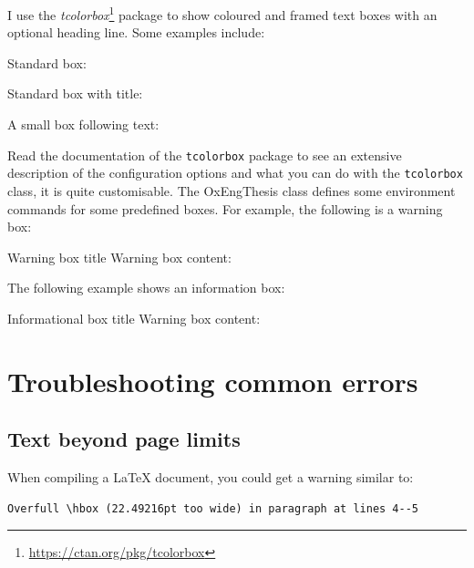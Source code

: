 I use the \textit{tcolorbox}\footnote{\url{https://ctan.org/pkg/tcolorbox}} package to show coloured and framed text boxes with an optional heading line. Some examples include:

\noindent Standard box:


\begin{tcolorbox}
\lipsum[1]
\end{tcolorbox}


\noindent Standard box with title:


\begin{tcolorbox}[title=Box title]
\lipsum[1]
\end{tcolorbox}


\noindent A small box following text:\dotfill{}\hfill


Read the documentation of the \verb|tcolorbox| package to see an extensive description of the configuration options and what you can do with the \verb|tcolorbox| class, it is quite customisable. The OxEngThesis class defines some environment commands for some predefined boxes. For example, the following is a warning box:


\begin{OxWarningBox}{Warning box title}
Warning box content: \lipsum[1]
\end{OxWarningBox}


The following example shows an information box:


\begin{OxInfoBox}{Informational box title}
Warning box content: \lipsum[1]
\end{OxInfoBox}


\section{Troubleshooting common errors}


\subsection{Text beyond page limits}


When compiling a LaTeX document, you could get a warning similar to:


\begin{lstlisting}[style=custom-text]
Overfull \hbox (22.49216pt too wide) in paragraph at lines 4--5
\end{lstlisting}


